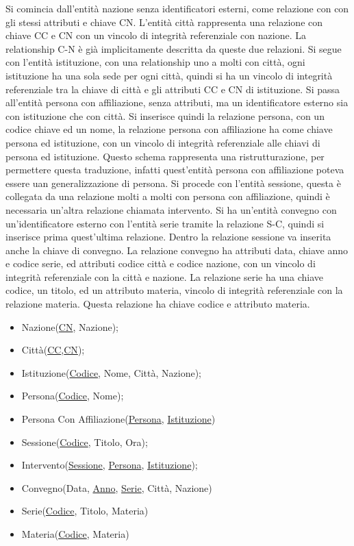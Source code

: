 \documentclass{article}
\numberwithin{equation}{subsection}
\begin{document}
Si comincia dall'entità nazione senza identificatori esterni, come relazione con con gli stessi attributi e chiave CN. L'entità città rappresenta una 
relazione con chiave CC e CN con un vincolo di integrità referenziale con nazione. La relationship C-N è già implicitamente descritta 
da queste due relazioni. Si segue con l'entità istituzione, con una relationship uno a molti con città, ogni istituzione ha una sola 
sede per ogni città, quindi si ha un vincolo di integrità referenziale tra la chiave di città e gli attributi CC e CN di istituzione. Si passa 
all'entità persona con affiliazione, senza attributi, ma un identificatore esterno sia con istituzione che con città. Si inserisce quindi 
la relazione persona, con un codice chiave ed un nome, la relazione persona con affiliazione ha come chiave persona ed istituzione, con un vincolo di 
integrità referenziale alle chiavi di persona ed istituzione. Questo schema rappresenta una ristrutturazione, per permettere questa traduzione, 
infatti quest'entità persona con affiliazione poteva essere uan generalizzazione di persona. Si procede con l'entità sessione, questa è collegata 
da una relazione molti a molti con persona con affiliazione, quindi è necessaria un'altra relazione chiamata intervento. 
Si ha un'entità convegno con un'identificatore esterno con l'entità serie tramite la relazione S-C, quindi si inserisce prima quest'ultima 
relazione. Dentro la relazione sessione va inserita anche la chiave di convegno. La relazione convegno ha attributi data, chiave anno e codice serie, 
ed attributi codice città e codice nazione, con un vincolo di integrità referenziale con la città e nazione. La relazione serie ha una chiave codice, 
un titolo, ed un attributo materia, vincolo di integrità referenziale con la relazione materia. Questa relazione ha chiave codice e attributo 
materia. 

\begin{itemize}
    \item Nazione(\underline{CN}, Nazione);
    \item Città(\underline{CC},\underline{CN});
    \item Istituzione(\underline{Codice}, Nome, Città, Nazione);
    \item Persona(\underline{Codice}, Nome);
    \item Persona Con Affiliazione(\underline{Persona}, \underline{Istituzione})
    \item Sessione(\underline{Codice}, Titolo, Ora);
    \item Intervento(\underline{Sessione}, \underline{Persona}, \underline{Istituzione});
    \item Convegno(Data, \underline{Anno}, \underline{Serie}, Città, Nazione)
    \item Serie(\underline{Codice}, Titolo, Materia)
    \item Materia(\underline{Codice}, Materia)
\end{itemize}
\end{document}
